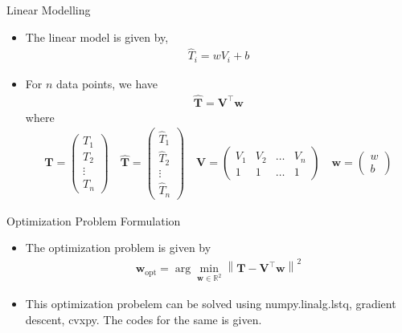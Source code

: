 \documentclass[10pt]{beamer}
\renewcommand{\vec}[1]{\boldsymbol{\mathbf{#1}}}
\newcommand{\myvec}[1]{\ensuremath{\begin{pmatrix}#1\end{pmatrix}}}
\providecommand{\norm}[1]{\left\lVert#1\right\rVert}
\begin{document}
\begin{frame}{Linear Modelling}
\begin{itemize}
\item The linear model is given by,
\begin{align}
	\hat{T}_{i} = w V_i + b
\end{align}
	\item For $n$ data points, we have
	\begin{align}
	\vec{\hat{T}} = \vec{V}^{\top}\vec{w}
	\end{align}
	where
	\begin{align}
		\vec{T} = \myvec{T_1 \\ T_2 \\ \vdots\\ T_n} \quad 
	\vec{\hat{T}} = \myvec{\hat{T}_{1} \\ \hat{T}_{2} \\ \vdots\\ \hat{T}_{n}} \quad
	\vec{V} = \myvec{V_1  & V_2 &  \ldots & V_n \\ 1 & 1 & \ldots &1}
	\quad
	\vec{w} = \myvec{w \\ b}
	\end{align}
\end{itemize}

\end{frame}

\begin{frame}{Optimization Problem Formulation}
\begin{itemize}

\item The optimization problem is given by
	\begin{align}
		\vec{w}_\text{opt} =  \arg\min_{\vec{w} \in \mathbb{R}^2}  \norm{\vec{T} - \vec{V}^{\top}\vec{w}}^2
	\end{align}
\item This optimization probelem can be solved using numpy.linalg.lstq, gradient descent, cvxpy. The codes for the same is given.
\end{itemize}
\end{frame}
\end{document}
